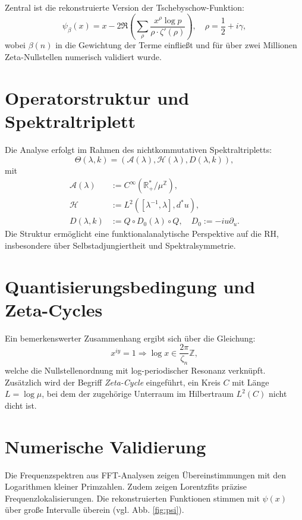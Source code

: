 \documentclass[11pt]{article}
\begin{document}
Zentral ist die rekonstruierte Version der Tschebyschow-Funktion:
\begin{equation}
\psi_\beta(x) = x - 2 \Re\left( \sum_\rho \frac{x^\rho \log p}{\rho \cdot \zeta'(\rho)} \right), \quad \rho = \frac{1}{2} + i\gamma,
\end{equation}
wobei $\beta(n)$ in die Gewichtung der Terme einfließt und für über zwei Millionen Zeta-Nullstellen numerisch validiert wurde.

\section{Operatorstruktur und Spektraltriplett}

Die Analyse erfolgt im Rahmen des nichtkommutativen Spektraltripletts:
\[
\Theta(\lambda, k) = (\mathcal{A}(\lambda), \mathcal{H}(\lambda), D(\lambda, k)),
\]
mit
\begin{align*}
\mathcal{A}(\lambda) &:= C^\infty(\mathbb{R}_+^*/\mu^\mathbb{Z}), \\
\mathcal{H} &:= L^2([\lambda^{-1}, \lambda], d^*u), \\
D(\lambda,k) &:= Q \circ D_0(\lambda) \circ Q, \quad D_0 := -i u \partial_u.
\end{align*}
Die Struktur ermöglicht eine funktionalanalytische Perspektive auf die RH, insbesondere über Selbstadjungiertheit und Spektralsymmetrie.

\section{Quantisierungsbedingung und Zeta-Cycles}

Ein bemerkenswerter Zusammenhang ergibt sich über die Gleichung:
\[
x^{iy} = 1 \Rightarrow \log x \in \frac{2\pi}{\zeta_n} \mathbb{Z},
\]
welche die Nullstellenordnung mit log-periodischer Resonanz verknüpft. Zusätzlich wird der Begriff \emph{Zeta-Cycle} eingeführt, ein Kreis $C$ mit Länge $L = \log \mu$, bei dem der zugehörige Unterraum im Hilbertraum $L^2(C)$ nicht dicht ist.

\section{Numerische Validierung}

Die Frequenzspektren aus FFT-Analysen zeigen Übereinstimmungen mit den Logarithmen kleiner Primzahlen. Zudem zeigen Lorentzfits präzise Frequenzlokalisierungen. Die rekonstruierten Funktionen stimmen mit $\psi(x)$ über große Intervalle überein (vgl. Abb. \ref{fig:psi}).
\end{document}
